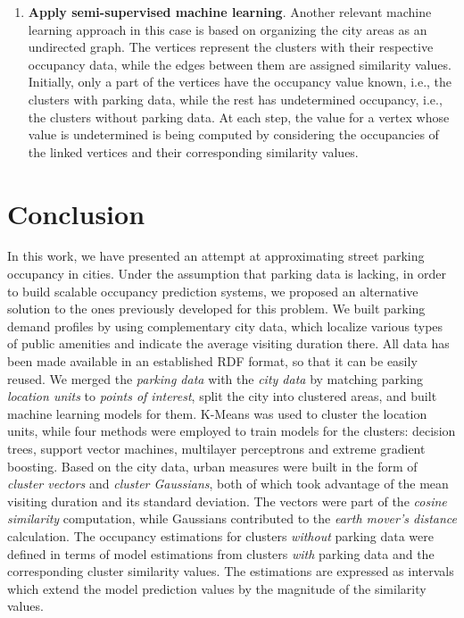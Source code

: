 \begin{enumerate}
	\item \textbf{Apply semi-supervised machine learning}.
	Another relevant machine learning approach in this case is based on organizing the city areas as an undirected graph.
	The vertices represent the clusters with their respective occupancy data, while the edges between them are assigned similarity values.
	Initially, only a part of the vertices have the occupancy value known, i.e., the clusters with parking data, while the rest has undetermined occupancy, i.e., the clusters without parking data.
	At each step, the value for a vertex whose value is undetermined is being computed by considering the occupancies of the linked vertices and their corresponding similarity values.
\end{enumerate} 


\section{Conclusion}
In this work, we have presented an attempt at approximating street parking occupancy in cities.
Under the assumption that parking data is lacking, in order to build scalable occupancy prediction systems, we proposed an alternative solution to the ones previously developed for this problem.
We built parking demand profiles by using complementary city data, which localize various types of public amenities and indicate the average visiting duration there.
All data has been made available in an established RDF format, so that it can be easily reused.
We merged the \textit{parking data} with the \textit{city data} by matching parking \textit{location units} to \textit{points of interest}, split the city into clustered areas, and built machine learning models for them.
K-Means was used to cluster the location units, while four methods were employed to train models for the clusters: decision trees, support vector machines, multilayer perceptrons and extreme gradient boosting.
Based on the city data, urban measures were built in the form of \textit{cluster vectors} and \textit{cluster Gaussians}, both of which took advantage of the mean visiting duration and its standard deviation.
The vectors were part of the \textit{cosine similarity} computation, while Gaussians contributed to the \textit{earth mover's distance} calculation.
The occupancy estimations for clusters \textit{without} parking data were defined in terms of model estimations from clusters \textit{with} parking data and the corresponding cluster similarity values.
The estimations are expressed as intervals which extend the model prediction values by the magnitude of the similarity values. 

